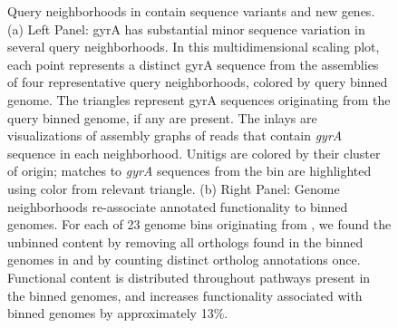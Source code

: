 \begin{figure}[!h]
    \hspace*{0.01\linewidth}%
    \caption{Query neighborhoods in \hu contain sequence variants and new genes.
      (a) Left Panel: gyrA has substantial minor sequence variation in several
      query neighborhoods. In this multidimensional scaling plot, each point
      represents a distinct gyrA sequence from the \plass assemblies of four
      representative query neighborhoods, colored by query binned genome.
      The triangles represent gyrA sequences originating from the
      query binned genome, if any are present.  The inlays
      are visualizations of assembly graphs of reads that contain {\em gyrA}
      sequence in each neighborhood. Unitigs are colored by their cluster of origin;
      matches to {\em gyrA} sequences from the bin are highlighted using color from relevant triangle.
      (b) Right Panel: Genome neighborhoods re-associate annotated
    functionality to binned genomes. For each of 23 genome bins
    originating from \hu, we found the unbinned content by removing all
    orthologs found in the binned genomes in \cite{hu} and by counting distinct
    ortholog annotations once. Functional content is
    distributed throughout pathways present in the binned genomes,
    and increases functionality associated with binned genomes by
    approximately 13\%.}
  \label{fig:hu_content}
\end{figure}


